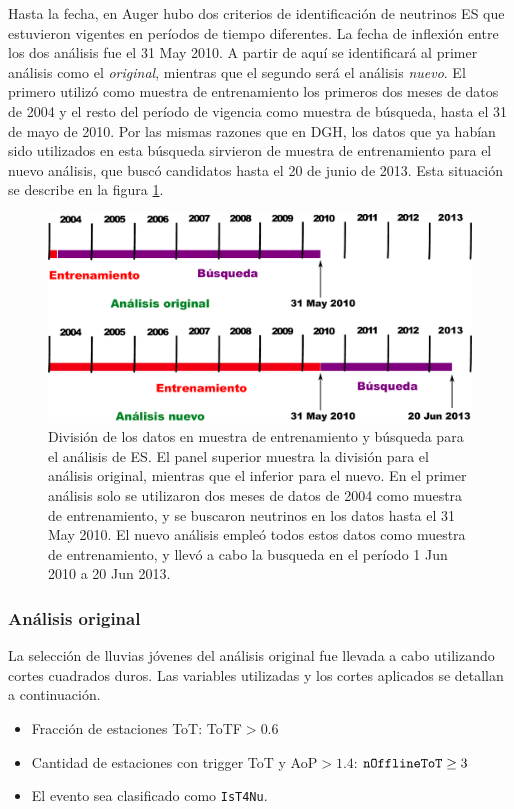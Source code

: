 	Hasta la fecha, en Auger hubo dos criterios de identificación de neutrinos ES que estuvieron vigentes en períodos de tiempo diferentes. 
	La fecha de inflexión entre los dos análisis fue el 31 May 2010.
	A partir de aquí se identificará al primer análisis como el \emph{original}, mientras que el segundo será el análisis \emph{nuevo}.
	El primero utilizó como muestra de entrenamiento los primeros dos meses de datos de 2004 y el resto del período de vigencia como muestra de búsqueda, hasta el 31 de mayo de 2010.
	Por las mismas razones que en DGH, los datos que ya hab\'ian sido utilizados en esta búsqueda sirvieron de muestra de entrenamiento para el nuevo análisis, que busc\'o candidatos hasta el 20 de junio de 2013.
	Esta situación se describe en la figura \ref{fig:periodosES}.
	\begin{figure}[ht]
	\begin{center}
	\includegraphics[width=\textwidth]{fig/seleccionAuger/periodosES}
	\caption{División de los datos en muestra de entrenamiento y búsqueda para el análisis de ES.
	El panel superior muestra la división para el análisis original, mientras que el inferior para el nuevo.
	En el primer análisis solo se utilizaron dos meses de datos de 2004 como muestra de entrenamiento, y se buscaron neutrinos en los datos hasta el 31 May 2010.
	El nuevo análisis empleó todos estos datos como muestra de entrenamiento, y llevó a cabo la busqueda en el período 1 Jun 2010 a 20 Jun 2013.}
	\label{fig:periodosES}
	\end{center}
	\end{figure}
	
	\subsubsection{Análisis original}
	
	La selección de lluvias jóvenes del análisis original fue llevada a cabo utilizando cortes cuadrados duros.
	Las variables utilizadas y los cortes aplicados se detallan a continuación.
	\begin{itemize}
	 \item Fracción de estaciones ToT: ToTF$>0.6$
	 \item Cantidad de estaciones con trigger ToT y AoP$>1.4$: ${\tt nOfflineToT}\geq3$
	 \item El evento sea clasificado como \texttt{IsT4Nu}. 
	\end{itemize}
	    
